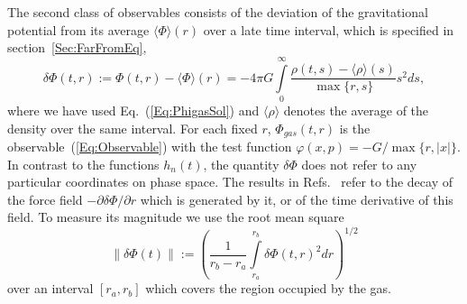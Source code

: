 The second class of observables consists of the deviation of the gravitational potential from its average $\langle\Phi\rangle(r)$ over a late time interval, which is specified in section~\ref{Sec:FarFromEq},
\begin{equation}
\delta\Phi(t,r) := \Phi(t,r) - \langle\Phi\rangle(r)
 = -4\pi G\int\limits_0^\infty \frac{\rho(t,s) - \langle\rho\rangle(s)}{\max\{ r,s \}} s^2 ds,
\label{Eq:deltaPhi}
\end{equation}
where we have used Eq.~(\ref{Eq:PhigasSol}) and $\langle\rho\rangle$ denotes the average of the density over the same interval. For each fixed $r$, $\Phi_{gas}(t,r)$ is the observable~(\ref{Eq:Observable}) with the test function $\varphi(x,p) = -G/\max\{ r,|x| \}$. In contrast to the functions $h_n(t)$, the quantity $\delta\Phi$ does not refer to any particular coordinates on phase space. The results in Refs.~\cite{mHgRmScS25,mHmS25} refer to the decay of the force field $-\partial\delta\Phi/\partial r$ which is generated by it, or of the time derivative of this field. To measure its magnitude we use the root mean square
\begin{equation}
\| \delta\Phi(t) \| := \left( \frac{1}{r_b - r_a}\int\limits_{r_a}^{r_b} \delta\Phi(t,r)^2 dr \right)^{1/2}
\label{Eq:deltaPhiNorm}
\end{equation}
over an interval $[r_a,r_b]$ which covers the region occupied by the gas.
